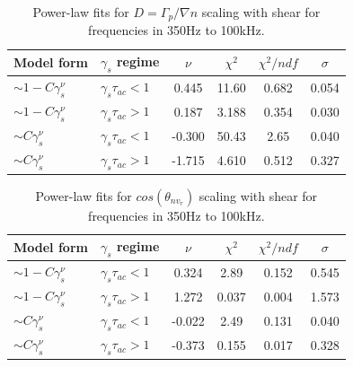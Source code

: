 \documentclass[aip,pop,amsmath,amssymb,peprint,superscriptaddress]{revtex4-1} %
\begin{document}
\begin{table}
\caption{\label{tab:table4}Power-law fits for $D = \Gamma_{p}/\nabla{n}$ scaling with shear for frequencies in 350Hz to 100kHz.}
\begin{ruledtabular}
\begin{tabular}{llcccc}
Model form&$\gamma_{s}$ regime&$\nu$&$\chi^2$&$\chi^2/ndf$&$\sigma$\\
\hline
$\sim 1-C\gamma_{s}^\nu$&$\gamma_{s}\tau_{ac}<1$ &0.445   &11.60    &0.682  &0.054\\
$\sim 1-C\gamma_{s}^\nu$&$\gamma_{s}\tau_{ac}>1$ &0.187   &3.188    &0.354  &0.030\\
$\sim C\gamma_{s}^\nu$&$\gamma_{s}\tau_{ac}<1$   &-0.300  &50.43    &2.65   &0.040\\
$\sim C\gamma_{s}^\nu$&$\gamma_{s}\tau_{ac}>1$   &-1.715  &4.610    &0.512  &0.327\\
\end{tabular}
\end{ruledtabular}
\end{table}

\begin{table}
\caption{\label{tab:table5}Power-law fits for $cos(\theta_{nv_{r}})$ scaling with shear for frequencies in 350Hz to 100kHz.}
\begin{ruledtabular}
\begin{tabular}{llcccc}
Model form&$\gamma_{s}$ regime&$\nu$&$\chi^2$&$\chi^2/ndf$&$\sigma$\\
\hline
$\sim 1-C\gamma_{s}^\nu$&$\gamma_{s}\tau_{ac}<1$ &0.324   &2.89     &0.152  &0.545\\
$\sim 1-C\gamma_{s}^\nu$&$\gamma_{s}\tau_{ac}>1$ &1.272   &0.037    &0.004  &1.573\\
$\sim C\gamma_{s}^\nu$&$\gamma_{s}\tau_{ac}<1$   &-0.022  &2.49     &0.131  &0.040\\
$\sim C\gamma_{s}^\nu$&$\gamma_{s}\tau_{ac}>1$   &-0.373  &0.155    &0.017  &0.328\\
\end{tabular}
\end{ruledtabular}
\end{table}
\end{document}
